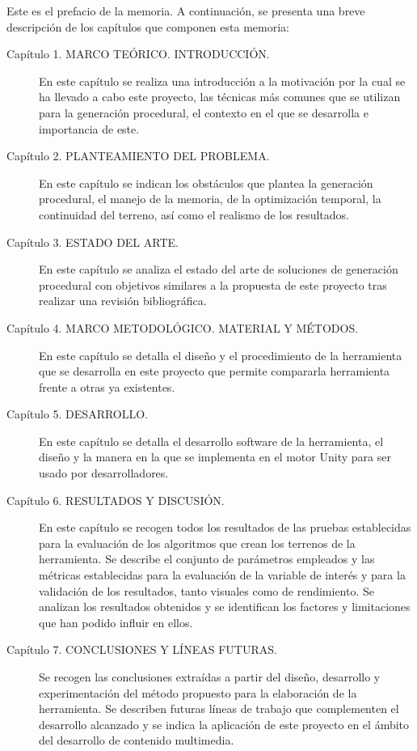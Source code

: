 Este es el prefacio de la memoria. A continuación, se presenta una breve descripción de los capítulos que componen esta memoria:

\begin{description}
  \item[Capítulo 1. MARCO TEÓRICO. INTRODUCCIÓN.] En este capítulo se realiza una introducción a la motivación por la cual se ha llevado a cabo este proyecto, las técnicas más comunes que se utilizan para la generación procedural, el contexto en el que se desarrolla e importancia de este.

  \item[Capítulo 2. PLANTEAMIENTO DEL PROBLEMA.] En este capítulo se indican los obstáculos que plantea la generación procedural, el manejo de la memoria, de la optimización temporal, la continuidad del terreno, así como el realismo de los resultados.

  \item[Capítulo 3. ESTADO DEL ARTE.] En este capítulo se analiza el estado del arte de soluciones de generación procedural con objetivos similares a la propuesta de este proyecto tras realizar una revisión bibliográfica.

  \item[Capítulo 4. MARCO METODOLÓGICO. MATERIAL Y MÉTODOS.] En este capítulo se detalla el diseño y el procedimiento de la herramienta que se desarrolla en este proyecto que permite compararla herramienta frente a otras ya existentes.

  \item[Capítulo 5. DESARROLLO.] En este capítulo se detalla el desarrollo software de la herramienta, el diseño y la manera en la que se implementa en el motor Unity para ser usado por desarrolladores.

  \item[Capítulo 6. RESULTADOS Y DISCUSIÓN.] En este capítulo se recogen todos los resultados de las pruebas establecidas para la evaluación de los algoritmos que crean los terrenos de la herramienta. Se describe el conjunto de parámetros empleados y las métricas establecidas para la evaluación de la variable de interés y para la validación de los resultados, tanto visuales como de rendimiento. Se analizan los resultados obtenidos y se identifican los factores y limitaciones que han podido influir en ellos.

  \item[Capítulo 7. CONCLUSIONES Y LÍNEAS FUTURAS.] Se recogen las conclusiones extraídas a partir del diseño, desarrollo y experimentación del método propuesto para la elaboración de la herramienta. Se describen futuras líneas de trabajo que complementen el desarrollo alcanzado y se indica la aplicación de este proyecto en el ámbito del desarrollo de contenido multimedia.
\end{description}